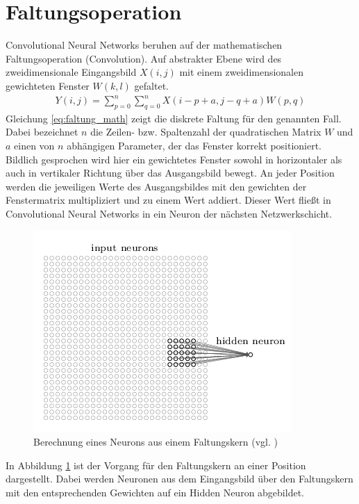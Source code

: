 \documentclass[../main.tex]{subfiles}
\begin{document}
\section{Faltungsoperation}
Convolutional Neural Networks beruhen auf der mathematischen Faltungsoperation (Convolution). Auf abstrakter Ebene wird des zweidimensionale Eingangsbild $X(i,j)$ mit einem zweidimensionalen gewichteten Fenster $W(k,l)$ gefaltet. 
\begin{align}
	Y(i,j) = \sum\limits_{p=0}^{n}\sum\limits_{q=0}^{n} X(i-p+a,j-q+a)W(p,q) \label{eq:faltung_math}
\end{align}
Gleichung \ref{eq:faltung_math} zeigt die diskrete Faltung für den genannten Fall. Dabei bezeichnet $n$ die Zeilen- bzw. Spaltenzahl der quadratischen Matrix $W$ und $a$ einen von $n$ abhängigen Parameter, der das Fenster korrekt positioniert. Bildlich gesprochen wird hier ein gewichtetes Fenster sowohl in horizontaler als auch in vertikaler Richtung über das Ausgangsbild bewegt. An jeder Position werden die jeweiligen Werte des Ausgangsbildes mit den gewichten der Fenstermatrix multipliziert und zu einem Wert addiert. Dieser Wert fließt in Convolutional Neural Networks in ein Neuron der nächsten Netzwerkschicht.\par
\begin{figure}[!htbp]
	\centering
	\includegraphics[width=0.8\linewidth]{../images/Riedle/Convolution_1}
	\caption{Berechnung eines Neurons aus einem Faltungskern (vgl. \cite{NNADL_PIC_CONV_1})} \label{fig:conv_1}
\end{figure} 
In Abbildung \ref{fig:conv_1} ist der Vorgang für den Faltungskern an einer Position dargestellt. Dabei werden Neuronen aus dem Eingangsbild über den Faltungskern mit den entsprechenden Gewichten auf ein Hidden Neuron abgebildet. \par 
\end{document}
